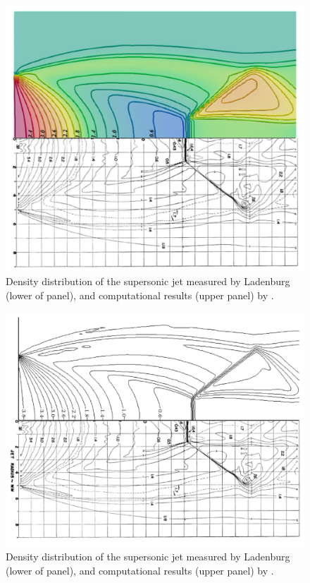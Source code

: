 \documentclass[12pt]{article}
\begin{document}
\begin{figure}[H]
    \centering
    \includegraphics[width=0.775\linewidth]{figs/comp2.png}
    \caption{Density distribution of the supersonic jet measured by Ladenburg~\cite{ladenburg1949interferometric} (lower of panel), and computational results (upper panel) by \cite{gilmanov2024development}. %
    } 
    \label{fig:comp2}
\end{figure}

\begin{figure}[H]
    \centering
    \includegraphics[width=0.95\linewidth]{figs/comp3.png}
    \caption{Density distribution of the supersonic jet measured by Ladenburg~\cite{ladenburg1949interferometric} (lower of panel), and computational results (upper panel) by \cite{greenshields2010implementation}. %
    }
    \label{fig:comp3}
\end{figure}
\end{document}
